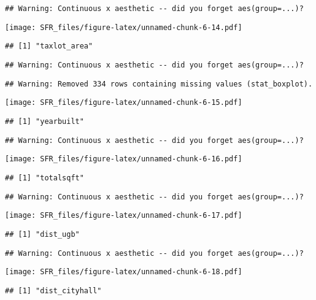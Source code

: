 \documentclass[]{article}
\begin{document}
\begin{verbatim}
## Warning: Continuous x aesthetic -- did you forget aes(group=...)?
\end{verbatim}

\texttt{[image: SFR\_files/figure-latex/unnamed-chunk-6-14.pdf]}

\begin{verbatim}
## [1] "taxlot_area"
\end{verbatim}

\begin{verbatim}
## Warning: Continuous x aesthetic -- did you forget aes(group=...)?
\end{verbatim}

\begin{verbatim}
## Warning: Removed 334 rows containing missing values (stat_boxplot).
\end{verbatim}

\texttt{[image: SFR\_files/figure-latex/unnamed-chunk-6-15.pdf]}

\begin{verbatim}
## [1] "yearbuilt"
\end{verbatim}

\begin{verbatim}
## Warning: Continuous x aesthetic -- did you forget aes(group=...)?
\end{verbatim}

\texttt{[image: SFR\_files/figure-latex/unnamed-chunk-6-16.pdf]}

\begin{verbatim}
## [1] "totalsqft"
\end{verbatim}

\begin{verbatim}
## Warning: Continuous x aesthetic -- did you forget aes(group=...)?
\end{verbatim}

\texttt{[image: SFR\_files/figure-latex/unnamed-chunk-6-17.pdf]}

\begin{verbatim}
## [1] "dist_ugb"
\end{verbatim}

\begin{verbatim}
## Warning: Continuous x aesthetic -- did you forget aes(group=...)?
\end{verbatim}

\texttt{[image: SFR\_files/figure-latex/unnamed-chunk-6-18.pdf]}

\begin{verbatim}
## [1] "dist_cityhall"
\end{verbatim}
\end{document}
